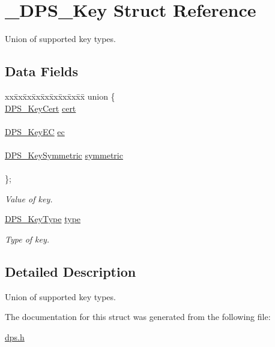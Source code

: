 \hypertarget{struct___d_p_s___key}{}\section{\+\_\+\+D\+P\+S\+\_\+\+Key Struct Reference}
\label{struct___d_p_s___key}


Union of supported key types.  


\subsection*{Data Fields}
\begin{DoxyCompactItemize}
\item 
\mbox{\label{struct___d_p_s___key_a34cd61abd9b28c058877dbc8478f43c1}} 
\begin{tabbing}
xx\=xx\=xx\=xx\=xx\=xx\=xx\=xx\=xx\=\kill
union \{\\
\>\hyperlink{group__keystore_ga98b6701b118cab76965736ad720f9bcf}{DPS\_KeyCert} \hyperlink{struct___d_p_s___key_ab26f5094ccd656e85b009f3ce26cc2a6}{cert}\\
\>\\
\>\hyperlink{group__keystore_ga658140277e0cd5c6ccc3b7727ecaae8a}{DPS\_KeyEC} \hyperlink{struct___d_p_s___key_a8cf482ff4fe81b774462469c5da9295f}{ec}\\
\>\\
\>\hyperlink{group__keystore_ga4c58e71301ab14e675033c601e4eabe1}{DPS\_KeySymmetric} \hyperlink{struct___d_p_s___key_a4e26dff7c8127c1709eac2f2f1eadc61}{symmetric}\\
\>\\
\}; \\

\end{tabbing}\begin{DoxyCompactList}\small\item\em Value of key. \end{DoxyCompactList}\item 
\mbox{\label{struct___d_p_s___key_a347677e64145828ed5b1191a8fdc71d5}} 
\hyperlink{group__keystore_ga7ca1045749c725e9c4a1b4758b2a0196}{D\+P\+S\+\_\+\+Key\+Type} \hyperlink{struct___d_p_s___key_a347677e64145828ed5b1191a8fdc71d5}{type}
\begin{DoxyCompactList}\small\item\em Type of key. \end{DoxyCompactList}\end{DoxyCompactItemize}


\subsection{Detailed Description}
Union of supported key types. 

The documentation for this struct was generated from the following file\+:\begin{DoxyCompactItemize}
\item 
\hyperlink{dps_8h}{dps.\+h}\end{DoxyCompactItemize}
